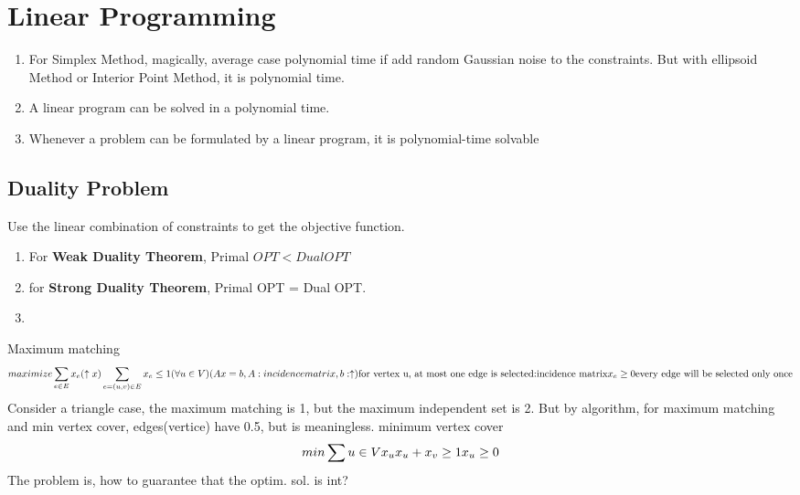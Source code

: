 \section{Linear Programming}

\begin{enumerate}
\item For Simplex Method, magically, average case polynomial time if add random Gaussian noise to the constraints. But with ellipsoid Method or Interior Point Method, it is polynomial time.
\item A linear program can be solved in a polynomial time.
\item Whenever a problem can be formulated by a linear
program, it is polynomial-time solvable
\end{enumerate}
\subsection{Duality Problem}
Use the linear combination of constraints to get the objective function.
\begin{enumerate}
    \item For \textbf{Weak Duality Theorem}, Primal $OPT < Dual OPT$
    \item for \textbf{Strong Duality Theorem}, Primal OPT = Dual OPT. %
    \item 
\end{enumerate}

Maximum matching 
\[
    maximize \sum_{e \in E} x_e(\uparrow x)\\
    \sum_{e=(u,v) \in E}x_e\leq 1 (\forall u \in V)\\(Ax=b, A:incidence matrix,b:\uparrow) \text{for vertex u, at most one edge is selected:incidence matrix} \\
    x_e\geq 0 \text{every edge will be selected only once}\\
\]
Consider a triangle case, the maximum matching is 1, but the maximum independent set is 2. 
But by algorithm, for maximum matching and min vertex cover, edges(vertice) have 0.5, but is meaningless.
minimum vertex cover
\[
    min  \sum{u\in V} x_u\\
    x_u+x_v\geq 1
    x_u\geq 0
    \]
The problem is, how to guarantee that the optim. sol. is int?
